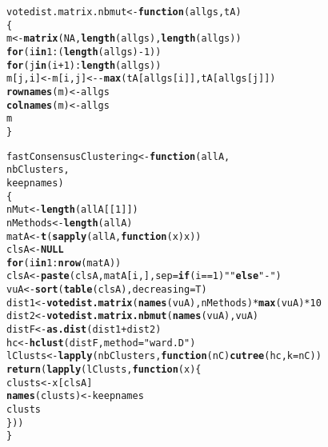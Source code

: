 \documentclass{article}\usepackage[]{graphicx}\usepackage[]{color}
\makeatletter
\newcommand{\hlnum}[1]{\textcolor[rgb]{0.686,0.059,0.569}{#1}}%
\newcommand{\hlstr}[1]{\textcolor[rgb]{0.192,0.494,0.8}{#1}}%
\newcommand{\hlopt}[1]{\textcolor[rgb]{0,0,0}{#1}}%
\newcommand{\hlstd}[1]{\textcolor[rgb]{0.345,0.345,0.345}{#1}}%
\newcommand{\hlkwa}[1]{\textcolor[rgb]{0.161,0.373,0.58}{\textbf{#1}}}%
\newcommand{\hlkwb}[1]{\textcolor[rgb]{0.69,0.353,0.396}{#1}}%
\newcommand{\hlkwc}[1]{\textcolor[rgb]{0.333,0.667,0.333}{#1}}%
\newcommand{\hlkwd}[1]{\textcolor[rgb]{0.737,0.353,0.396}{\textbf{#1}}}%
\newenvironment{kframe}{%
 \def\at@end@of@kframe{}%
 \ifinner\ifhmode%
  \def\at@end@of@kframe{\end{minipage}}%
  \begin{minipage}{\columnwidth}%
 \fi\fi%
 \def\FrameCommand##1{\hskip\@totalleftmargin \hskip-\fboxsep
 \colorbox{shadecolor}{##1}\hskip-\fboxsep
     \hskip-\linewidth \hskip-\@totalleftmargin \hskip\columnwidth}%
 \MakeFramed {\advance\hsize-\width
   \@totalleftmargin\z@ \linewidth\hsize
   \@setminipage}}%
 {\par\unskip\endMakeFramed%
 \at@end@of@kframe}
\newenvironment{knitrout}{}{} %
\makeatother
\begin{document}
\begin{knitrout}
\begin{kframe}
\begin{alltt}
\hlstd{votedist.matrix.nbmut} \hlkwb{<-} \hlkwa{function}\hlstd{(}\hlkwc{allgs}\hlstd{,}\hlkwc{tA}\hlstd{)}
\hlstd{\{}
    \hlstd{m} \hlkwb{<-} \hlkwd{matrix}\hlstd{(}\hlnum{NA}\hlstd{,}\hlkwd{length}\hlstd{(allgs),}\hlkwd{length}\hlstd{(allgs))}
    \hlkwa{for}\hlstd{(i} \hlkwa{in} \hlnum{1}\hlopt{:}\hlstd{(}\hlkwd{length}\hlstd{(allgs)}\hlopt{-}\hlnum{1}\hlstd{))}
        \hlkwa{for}\hlstd{(j} \hlkwa{in} \hlstd{(i}\hlopt{+}\hlnum{1}\hlstd{)}\hlopt{:}\hlkwd{length}\hlstd{(allgs))}
            \hlstd{m[j,i]} \hlkwb{<-} \hlstd{m[i,j]} \hlkwb{<-} \hlopt{-}\hlkwd{max}\hlstd{(tA[allgs[i]],tA[allgs[j]])}
    \hlkwd{rownames}\hlstd{(m)} \hlkwb{<-} \hlstd{allgs}
    \hlkwd{colnames}\hlstd{(m)} \hlkwb{<-} \hlstd{allgs}
    \hlstd{m}
\hlstd{\}}

\hlstd{fastConsensusClustering} \hlkwb{<-} \hlkwa{function}\hlstd{(}\hlkwc{allA}\hlstd{,}
                                    \hlkwc{nbClusters}\hlstd{,}
                                    \hlkwc{keepnames}\hlstd{)}
\hlstd{\{}
    \hlstd{nMut} \hlkwb{<-} \hlkwd{length}\hlstd{(allA[[}\hlnum{1}\hlstd{]])}
    \hlstd{nMethods} \hlkwb{<-} \hlkwd{length}\hlstd{(allA)}
    \hlstd{matA} \hlkwb{<-} \hlkwd{t}\hlstd{(}\hlkwd{sapply}\hlstd{(allA,}\hlkwa{function}\hlstd{(}\hlkwc{x}\hlstd{) x))}
    \hlstd{clsA} \hlkwb{<-} \hlkwa{NULL}
    \hlkwa{for}\hlstd{(i} \hlkwa{in} \hlnum{1}\hlopt{:}\hlkwd{nrow}\hlstd{(matA))}
        \hlstd{clsA} \hlkwb{<-} \hlkwd{paste}\hlstd{(clsA,matA[i,],}\hlkwc{sep}\hlstd{=}\hlkwa{if}\hlstd{(i}\hlopt{==}\hlnum{1}\hlstd{)} \hlstr{""} \hlkwa{else} \hlstr{"-"}\hlstd{)}
    \hlstd{vuA} \hlkwb{<-} \hlkwd{sort}\hlstd{(}\hlkwd{table}\hlstd{(clsA),}\hlkwc{decreasing}\hlstd{=T)}
    \hlstd{dist1} \hlkwb{<-} \hlkwd{votedist.matrix}\hlstd{(}\hlkwd{names}\hlstd{(vuA),nMethods)}\hlopt{*}\hlkwd{max}\hlstd{(vuA)}\hlopt{*}\hlnum{10}
    \hlstd{dist2} \hlkwb{<-} \hlkwd{votedist.matrix.nbmut}\hlstd{(}\hlkwd{names}\hlstd{(vuA),vuA)}
    \hlstd{distF} \hlkwb{<-} \hlkwd{as.dist}\hlstd{(dist1}\hlopt{+}\hlstd{dist2)}
    \hlstd{hc} \hlkwb{<-} \hlkwd{hclust}\hlstd{(distF,}\hlkwc{method}\hlstd{=}\hlstr{"ward.D"}\hlstd{)}
    \hlstd{lClusts} \hlkwb{<-} \hlkwd{lapply}\hlstd{(nbClusters,}\hlkwa{function}\hlstd{(}\hlkwc{nC}\hlstd{)} \hlkwd{cutree}\hlstd{(hc,}\hlkwc{k}\hlstd{=nC))}
    \hlkwd{return}\hlstd{(}\hlkwd{lapply}\hlstd{(lClusts,}\hlkwa{function}\hlstd{(}\hlkwc{x}\hlstd{)\{}
        \hlstd{clusts} \hlkwb{<-} \hlstd{x[clsA]}
        \hlkwd{names}\hlstd{(clusts)} \hlkwb{<-} \hlstd{keepnames}
        \hlstd{clusts}
    \hlstd{\}))}
\hlstd{\}}


\end{alltt}
\end{kframe}
\end{knitrout}
\end{document}
